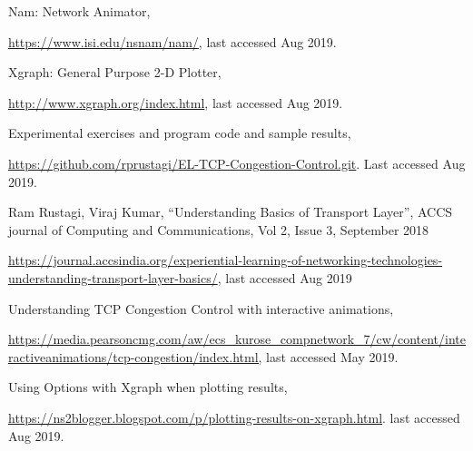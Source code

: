 \begin{multicols}{2}
\begin{thebibliography}{99}
 Nam: Network Animator,

\url{ https://www.isi.edu/nsnam/nam/}, last accessed Aug 2019.

 Xgraph: General Purpose 2-D Plotter, 

\url{http://www.xgraph.org/index.html}, last accessed Aug 2019.

 Experimental exercises and program code and sample results, 

\url{https://github.com/rprustagi/EL-TCP-Congestion-Control.git}. Last accessed Aug 2019.

 Ram Rustagi, Viraj Kumar, “Understanding Basics of Transport Layer”, ACCS journal of Computing and Communications, Vol 2, Issue 3, September 2018 

\url{https://journal.accsindia.org/experiential-learning-of-networking-technologies-understanding-transport-layer-basics/}, last accessed Aug 2019

 Understanding TCP Congestion Control with interactive animations,

\url{https://media.pearsoncmg.com/aw/ecs\_kurose\_compnetwork\_7/cw/content/interactiveanimations/tcp-congestion/index.html,} last accessed May 2019.

 Using Options with Xgraph when plotting results,

\url{https://ns2blogger.blogspot.com/p/plotting-results-on-xgraph.html}. last accessed Aug 2019.

\end{thebibliography}
\end{multicols}






